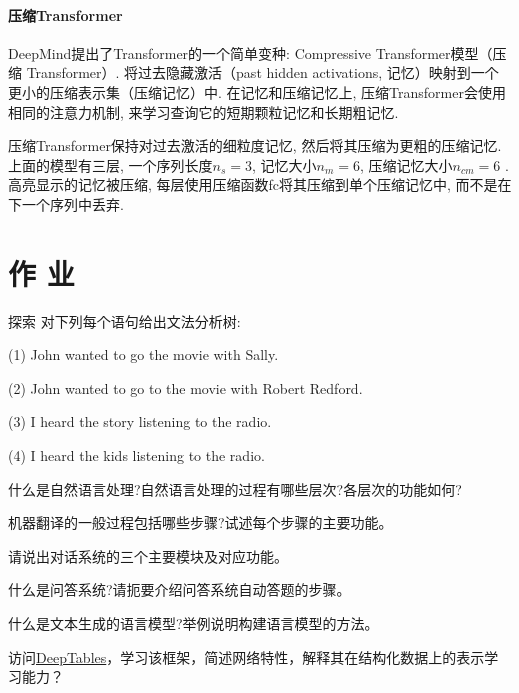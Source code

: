\paragraph{压缩Transformer}

DeepMind提出了Transformer的一个简单变种:  Compressive Transformer模型（压缩 Transformer）.
将过去隐藏激活（past hidden activations, 记忆）映射到一个更小的压缩表示集（压缩记忆）中. 在记忆和压缩记忆上, 压缩Transformer会使用相同的注意力机制, 来学习查询它的短期颗粒记忆和长期粗记忆.

压缩Transformer保持对过去激活的细粒度记忆, 然后将其压缩为更粗的压缩记忆. 上面的模型有三层, 一个序列长度$n_s = 3$, 记忆大小$n_m = 6$, 压缩记忆大小$n_{cm} = 6$ \cite{raecompressive2019}. 高亮显示的记忆被压缩, 每层使用压缩函数fc将其压缩到单个压缩记忆中, 而不是在下一个序列中丢弃.
\section{作 业 }
\begin{custom}[explorecolor]{探索}
对下列每个语句给出文法分析树:

    (1)  John  wanted  to  go  the  movie  with  Sally.

    (2)  John  wanted  to  go  to  the  movie  with  Robert  Redford.

    (3)  I  heard  the  story  listening  to  the  radio.

    (4)  I  heard  the  kids  listening  to  the  radio.
\end{custom}

\begin{think}
  什么是自然语言处理?自然语言处理的过程有哪些层次?各层次的功能如何?
\end{think}

\begin{think}
  机器翻译的一般过程包括哪些步骤?试述每个步骤的主要功能。
\end{think}
\begin{think}
  请说出对话系统的三个主要模块及对应功能。
\end{think}

\begin{think}
  什么是问答系统?请扼要介绍问答系统自动答题的步骤。
\end{think}

\begin{think}
  什么是文本生成的语言模型?举例说明构建语言模型的方法。
\end{think}

\begin{think}
    访问\href{https://github.com/DataCanvasIO/deeptables}{DeepTables}，学习该框架，简述网络特性，解释其在结构化数据上的表示学习能力？
\end{think} 